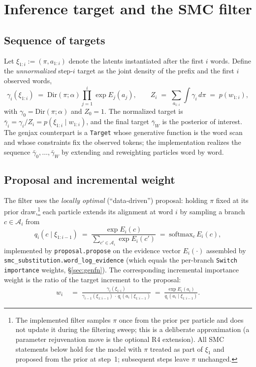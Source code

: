 \documentclass[11pt]{article}
\newcommand{\given}{\mid}
\newcommand{\Dir}{\mathrm{Dir}}
\newcommand{\code}[1]{\texttt{#1}}
\begin{document}
\section{Inference target and the SMC filter}
\label{sec:smc}

\subsection{Sequence of targets}

Let $\xi_{1:i} := (\pi, a_{1:i})$ denote the latents instantiated after the first $i$ words. Define
the \emph{unnormalized} step-$i$ target as the joint density of the prefix and the first $i$ observed
words,
\begin{equation}\label{eq:gamma}
  \gamma_i(\xi_{1:i}) \;=\; \Dir(\pi;\alpha)\prod_{j=1}^{i}\exp E_j(a_j),
  \qquad
  Z_i \;=\; \sum_{a_{1:i}}\int \gamma_i \,d\pi \;=\; p(w_{1:i}),
\end{equation}
with $\gamma_0 = \Dir(\pi;\alpha)$ and $Z_0 = 1$. The normalized target is
$\bar\gamma_i = \gamma_i / Z_i = p(\xi_{1:i}\given w_{1:i})$, and the final target $\bar\gamma_W$ is the
posterior of interest. The genjax counterpart is a \code{Target} whose generative function is the
word scan and whose constraints fix the observed tokens; the implementation realizes the sequence
$\bar\gamma_0,\dots,\bar\gamma_W$ by extending and reweighting particles word by word.

\subsection{Proposal and incremental weight}

The filter uses the \emph{locally optimal} (``data-driven'') proposal: holding $\pi$ fixed at its
prior draw,\footnote{The implemented filter samples $\pi$ once from the prior per particle and does
not update it during the filtering sweep; this is a deliberate approximation (a parameter rejuvenation
move is the optional R4 extension). All SMC statements below hold for the model with $\pi$ treated as
part of $\xi_1$ and proposed from the prior at step~1; subsequent steps leave $\pi$ unchanged.}
each particle extends its alignment at word $i$ by sampling a branch $c \in \mathcal{A}_i$ from
\begin{equation}\label{eq:proposal}
  q_i(c \given \xi_{1:i-1}) \;=\; \frac{\exp E_i(c)}{\sum_{c'\in\mathcal{A}_i}\exp E_i(c')}
  \;=\; \mathrm{softmax}_c\, E_i(c),
\end{equation}
implemented by \code{proposal.propose} on the evidence vector
$E_i(\cdot)$ assembled by \code{smc\_substitution.word\_log\_evidence} (which equals the per-branch
\code{Switch} \code{importance} weights, \S\ref{sec:genfn}). The corresponding incremental importance
weight is the ratio of the target increment to the proposal:
\begin{align}
  w_i
  &\;=\; \frac{\gamma_i(\xi_{1:i})}{\gamma_{i-1}(\xi_{1:i-1})\,\cdot\,q_i(a_i\given \xi_{1:i-1})}
  \;=\; \frac{\exp E_i(a_i)}{q_i(a_i\given\xi_{1:i-1})}. \label{eq:wstep}
\end{align}
\end{document}
